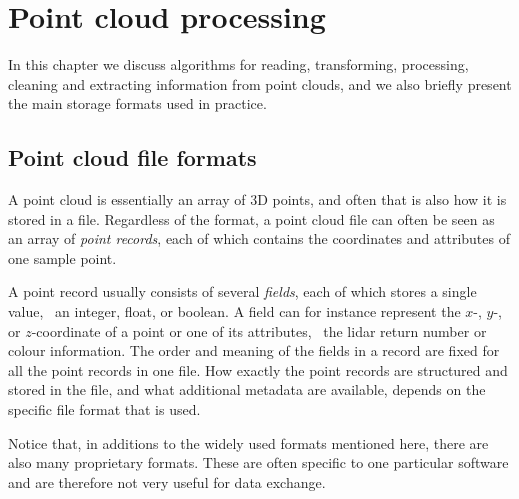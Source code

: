 
\setchapterpreamble[u]{\margintoc}


\graphicspath{{pcprocessing/}}

\chapter{Point cloud processing}%
\label{chap:pcprocessing}

In this chapter we discuss algorithms for reading, transforming, processing, cleaning and extracting information from point clouds, and we also briefly present the main storage formats used in practice.



%
\section{Point cloud file formats}

A point cloud is essentially an array of 3D points, and often that is also how it is stored in a file.
Regardless of the format, a point cloud file can often be seen as an array of \emph{point records}, each of which contains the coordinates and attributes of one sample point.

A point record usually consists of several \emph{fields}, each of which stores a single value, \eg\ an integer, float, or boolean.
A field can for instance represent the $x$-, $y$-, or $z$-coordinate of a point or one of its attributes, \eg\ the lidar return number or colour information.
The order and meaning of the fields in a record are fixed for all the point records in one file.
How exactly the point records are structured and stored in the file, and what additional metadata are available, depends on the specific file format that is used.

Notice that, in additions to the widely used formats mentioned here, there are also many proprietary formats. These are often specific to one particular software and are therefore not very useful for data exchange.


